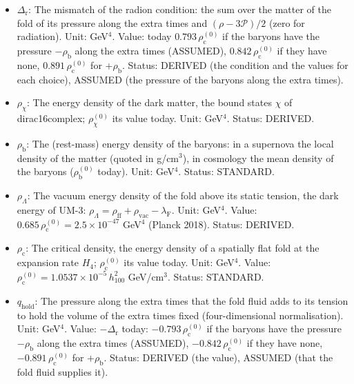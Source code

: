 \documentclass[
  10pt,
]{article}
\providecommand{\tightlist}{%
  \setlength{\itemsep}{0pt}\setlength{\parskip}{0pt}}
\begin{document}
\begin{itemize}
\tightlist
\item
  \(\Delta_{\mathrm{r}}\): The mismatch of the radion condition: the sum
  over the matter of the fold of its pressure along the extra times and
  \((\rho - 3\mathcal{P})/2\) (zero for radiation). Unit: GeV\(^4\).
  Value: today \(0.793\,\rho_{\mathrm{c}}^{(0)}\) if the baryons have
  the pressure \(-\rho_{\mathrm{b}}\) along the extra times (ASSUMED),
  \(0.842\,\rho_{\mathrm{c}}^{(0)}\) if they have none,
  \(0.891\,\rho_{\mathrm{c}}^{(0)}\) for \(+\rho_{\mathrm{b}}\). Status:
  DERIVED (the condition and the values for each choice), ASSUMED (the
  pressure of the baryons along the extra times).
\item
  \(\rho_\chi\): The energy density of the dark matter, the bound states
  \(\chi\) of dirac16complex; \(\rho_\chi^{(0)}\) its value today. Unit:
  GeV\(^4\). Status: DERIVED.
\item
  \(\rho_{\mathrm{b}}\): The (rest-mass) energy density of the baryons:
  in a supernova the local density of the matter (quoted in g/cm\(^3\)),
  in cosmology the mean density of the baryons
  (\(\rho_{\mathrm{b}}^{(0)}\) today). Unit: GeV\(^4\). Status:
  STANDARD.
\item
  \(\rho_\Lambda\): The vacuum energy density of the fold above its
  static tension, the dark energy of UM-3:
  \(\rho_\Lambda = \rho_{\mathrm{ff}} + \rho_{\mathrm{vac}} - \lambda_{\mathrm{F}}\).
  Unit: GeV\(^4\). Value:
  \(0.685\,\rho_{\mathrm{c}}^{(0)} = 2.5\times10^{-47}\) GeV\(^4\)
  (Planck 2018). Status: DERIVED.
\item
  \(\rho_{\mathrm{c}}\): The critical density, the energy density of a
  spatially flat fold at the expansion rate \(H_4\);
  \(\rho_{\mathrm{c}}^{(0)}\) its value today. Unit: GeV\(^4\). Value:
  \(\rho_{\mathrm{c}}^{(0)} = 1.0537\times10^{-5}\,h_{100}^2\)
  GeV/cm\(^3\). Status: STANDARD.
\item
  \(q_{\mathrm{hold}}\): The pressure along the extra times that the
  fold fluid adds to its tension to hold the volume of the extra times
  fixed (four-dimensional normalisation). Unit: GeV\(^4\). Value:
  \(-\Delta_{\mathrm{r}}\) today: \(-0.793\,\rho_{\mathrm{c}}^{(0)}\) if
  the baryons have the pressure \(-\rho_{\mathrm{b}}\) along the extra
  times (ASSUMED), \(-0.842\,\rho_{\mathrm{c}}^{(0)}\) if they have
  none, \(-0.891\,\rho_{\mathrm{c}}^{(0)}\) for \(+\rho_{\mathrm{b}}\).
  Status: DERIVED (the value), ASSUMED (that the fold fluid supplies
  it).
\end{itemize}
\end{document}
